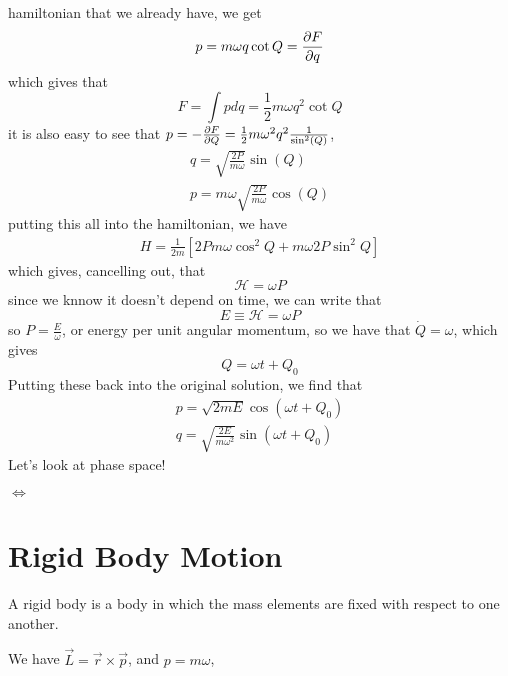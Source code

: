 \documentclass{article} \usepackage{amsmath} \usepackage{amssymb} \usepackage{amsthm} \usepackage[margin=0.2in]{geometry} \usepackage{hyperref} \usepackage{physics} \usepackage{tikz} \usepackage{mathtools} \mathtoolsset{showonlyrefs} \theoremstyle{definition} \newtheorem{theorem}{Theorem}[section] \newtheorem{corollary}{Corollary}[theorem] \newtheorem{lemma}[theorem]{Lemma} \newtheorem{definition}{Definition}[section] \author{Connor Duncan} \date{\today}
\begin{document}
hamiltonian that we already have, we get \begin{align} p=m\omega q\cot Q=\pdv{F}{q} \end{align} which gives that \begin{equation} F=\int pdq=\frac{1}{2}m\omega q^2\cot Q \end{equation} it is also easy to see that $p=-\pdv{F}{Q}=\frac{1}{2}m\omega^2q^2\frac{1}{\sin^2(Q)}$, \begin{align} q=\sqrt{\frac{2P}{m\omega}}\sin(Q)\\ p=m\omega\sqrt{\frac{2P}{m\omega}}\cos(Q) \end{align} putting this all into the hamiltonian, we have \begin{align} H=\frac{1}{2m}\left[2Pm\omega\cos^2Q+m\omega2P\sin^2Q\right] \end{align} which gives, cancelling out, that \begin{equation} \mathcal H=\omega P \end{equation} since we knnow it doesn't depend on time, we can write that \begin{equation} E\equiv\mathcal H=\omega P \end{equation} so $P=\frac{E}{\omega}$, or energy per unit angular momentum, so we have that $\dot Q=\omega$, which gives \begin{equation} Q=\omega t+Q_0 \end{equation} Putting these back into the original solution, we find that \begin{align} p=\sqrt{2mE}\cos(\omega t+Q_0)\\ q=\sqrt{\frac{2E}{m\omega^2}}\sin(\omega t+Q_0) \end{align} Let's look at phase space! \begin{center}  $\Leftrightarrow$  \end{center} \section{Rigid Body Motion}  A rigid body is a body in which the mass elements are fixed with respect to one another. \begin{center}  \end{center} We have $\vec{L}=\vec{r}\times\vec{p}$, and $p=m\omega$, 
\end{document}
